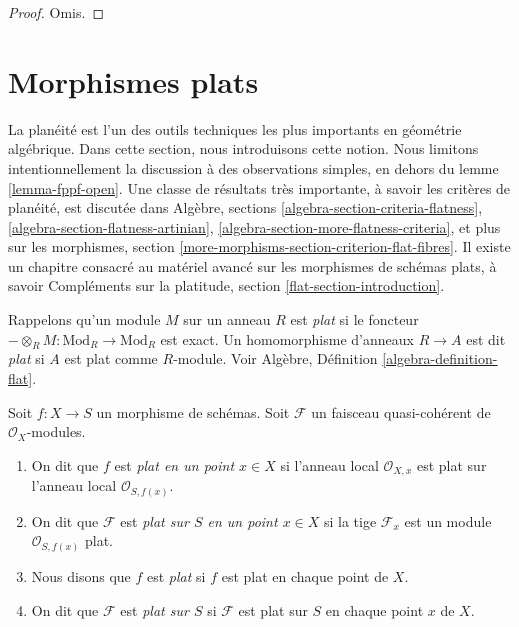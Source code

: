 \begin{proof}
Omis.
\end{proof}










\section{Morphismes plats}
\label{section-flat}

\noindent
La planéité est l'un des outils techniques les plus importants en
géométrie algébrique. Dans cette section, nous introduisons cette notion.
Nous limitons intentionnellement la discussion à des observations
simples, en dehors du lemme \ref{lemma-fppf-open}. Une classe
de résultats
très importante, à savoir les critères de
planéité, est discutée dans Algèbre,
sections \ref{algebra-section-criteria-flatness}, \ref{algebra-section-flatness-artinian}, \ref{algebra-section-more-flatness-criteria},
et plus sur les
morphismes, section \ref{more-morphisms-section-criterion-flat-fibres}. Il existe un
chapitre consacré au matériel avancé sur les morphismes de
schémas plats, à savoir Compléments sur la platitude, section \ref{flat-section-introduction}.

\medskip\noindent Rappelons
qu'un module $M$ sur un anneau $R$ est {\it plat}
si le foncteur $-\otimes_R M : \text{Mod}_R \to \text{Mod}_R$ est exact. Un homomorphisme d'anneaux $R \to A$
est dit {\it plat} si $A$ est plat comme $R$-module.
Voir
Algèbre, Définition \ref{algebra-definition-flat}.

\begin{definition}
\label{definition-flat}
Soit $f : X \to S$ un morphisme de schémas.
Soit $\mathcal{F}$ un faisceau quasi-cohérent de $\mathcal{O}_X$-modules.
\begin{enumerate}
\item On dit que $f$ est {\it plat en un point
$x \in X$} si l'anneau local $\mathcal{O}_{X, x}$ est plat sur
l'anneau local $\mathcal{O}_{S, f(x)}$.
\item On dit que $\mathcal{F}$ est {\it plat sur $S$ en un point
$x \in X$} si la tige $\mathcal{F}_x$ est un module $\mathcal{O}_{S, f(x)}$ plat.
\item Nous disons que $f$ est {\it plat} si $f$ est plat en chaque point de $X$.
\item On dit que $\mathcal{F}$ est {\it plat sur $S$}
si $\mathcal{F}$ est plat sur $S$ en chaque point $x$ de $X$.
\end{enumerate}
\end{definition}

